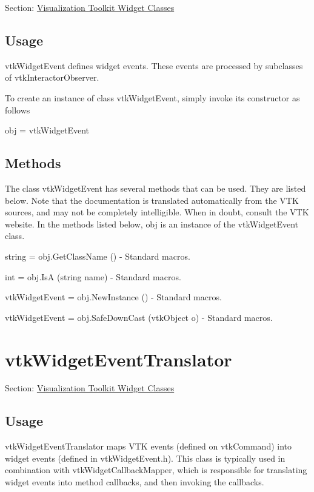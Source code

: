 Section\-: \hyperlink{sec_vtkwidgets}{Visualization Toolkit Widget Classes} \hypertarget{vtkwidgets_vtkxyplotwidget_Usage}{}\subsection{Usage}\label{vtkwidgets_vtkxyplotwidget_Usage}
vtk\-Widget\-Event defines widget events. These events are processed by subclasses of vtk\-Interactor\-Observer.

To create an instance of class vtk\-Widget\-Event, simply invoke its constructor as follows \begin{DoxyVerb}  obj = vtkWidgetEvent
\end{DoxyVerb}
 \hypertarget{vtkwidgets_vtkxyplotwidget_Methods}{}\subsection{Methods}\label{vtkwidgets_vtkxyplotwidget_Methods}
The class vtk\-Widget\-Event has several methods that can be used. They are listed below. Note that the documentation is translated automatically from the V\-T\-K sources, and may not be completely intelligible. When in doubt, consult the V\-T\-K website. In the methods listed below, {\ttfamily obj} is an instance of the vtk\-Widget\-Event class. 
\begin{DoxyItemize}
\item {\ttfamily string = obj.\-Get\-Class\-Name ()} -\/ Standard macros.  
\item {\ttfamily int = obj.\-Is\-A (string name)} -\/ Standard macros.  
\item {\ttfamily vtk\-Widget\-Event = obj.\-New\-Instance ()} -\/ Standard macros.  
\item {\ttfamily vtk\-Widget\-Event = obj.\-Safe\-Down\-Cast (vtk\-Object o)} -\/ Standard macros.  
\end{DoxyItemize}\hypertarget{vtkwidgets_vtkwidgeteventtranslator}{}\section{vtk\-Widget\-Event\-Translator}\label{vtkwidgets_vtkwidgeteventtranslator}
Section\-: \hyperlink{sec_vtkwidgets}{Visualization Toolkit Widget Classes} \hypertarget{vtkwidgets_vtkxyplotwidget_Usage}{}\subsection{Usage}\label{vtkwidgets_vtkxyplotwidget_Usage}
vtk\-Widget\-Event\-Translator maps V\-T\-K events (defined on vtk\-Command) into widget events (defined in vtk\-Widget\-Event.\-h). This class is typically used in combination with vtk\-Widget\-Callback\-Mapper, which is responsible for translating widget events into method callbacks, and then invoking the callbacks.

